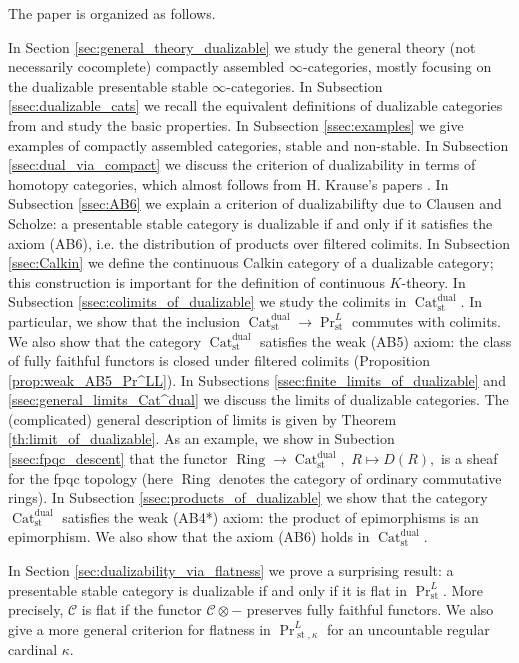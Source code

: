\documentclass[11pt,leqno]{amsart}
\numberwithin{equation}{section}
\newcommand{\Cat}{\operatorname{Cat}}
\newcommand{\Ring}{\operatorname{Ring}}
\newcommand{\st}{\operatorname{st}}
\newcommand{\dual}{\operatorname{dual}}
\newcommand{\cC}{{\mathcal C}}
\begin{document}
The paper is organized as follows.

In Section \ref{sec:general_theory_dualizable} we study the general theory (not necessarily cocomplete) compactly assembled $\infty$-categories, mostly focusing on the dualizable presentable stable $\infty$-categories. In Subsection \ref{ssec:dualizable_cats} we recall the equivalent definitions of dualizable categories from \cite{Lur18} and study the basic properties. In Subsection \ref{ssec:examples} we give examples of compactly assembled categories, stable and non-stable. In Subsection \ref{ssec:dual_via_compact} we discuss the criterion of dualizability in terms of homotopy categories, which almost follows from H. Krause's papers \cite{Kr00, Kr05}. In Subsection \ref{ssec:AB6} we explain a criterion of dualizabilifty due to Clausen and Scholze: a presentable stable category is dualizable if and only if it satisfies the axiom (AB6), i.e. the distribution of products over filtered colimits. In Subsection \ref{ssec:Calkin} we define the continuous Calkin category of a dualizable category; this construction is important for the definition of continuous $K$-theory. In Subsection \ref{ssec:colimits_of_dualizable} we study the colimits in $\Cat_{\st}^{\dual}.$ In particular, we show that the inclusion $\Cat_{\st}^{\dual}\to\Pr_{\st}^L$ commutes with colimits. We also show that the category $\Cat_{\st}^{\dual}$ satisfies the weak (AB5) axiom: the class of fully faithful functors is closed under filtered colimits (Proposition \ref{prop:weak_AB5_Pr^LL}). In Subsections \ref{ssec:finite_limits_of_dualizable} and \ref{ssec:general_limits_Cat^dual} we discuss the limits of dualizable categories. The (complicated) general description of limits is given by Theorem \ref{th:limit_of_dualizable}. As an example, we show in Subection \ref{ssec:fpqc_descent} that the functor $\Ring\to\Cat_{\st}^{\dual},$ $R\mapsto D(R),$ is a sheaf for the fpqc topology (here $\Ring$ denotes the category of ordinary commutative rings). In Subsection \ref{ssec:products_of_dualizable} we show that the category $\Cat_{\st}^{\dual}$ satisfies the weak (AB4*) axiom: the product of epimorphisms is an epimorphism. We also show that the axiom (AB6) holds in $\Cat_{\st}^{\dual}.$

In Section \ref{sec:dualizability_via_flatness} we prove a surprising result: a presentable stable category is dualizable if and only if it is flat in $\Pr_{\st}^L.$ More precisely, $\cC$ is flat if the functor $\cC\otimes-$ preserves fully faithful functors. We also give a more general criterion for flatness in $\Pr^L_{\st,\kappa}$ for an uncountable regular cardinal $\kappa.$
\end{document}
